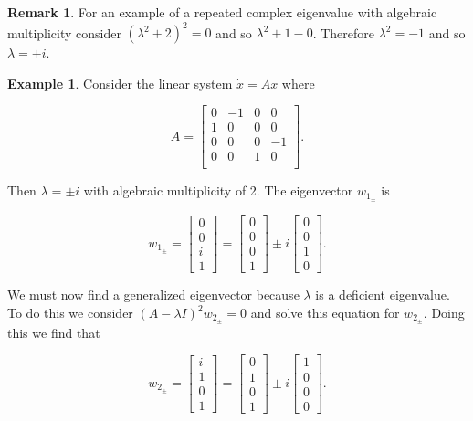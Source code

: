 \documentclass[12pt]{article}
\theoremstyle{definition}
\newtheorem*{example}{Example}
\newtheorem*{remark}{Remark}
\begin{document}
\begin{remark}
For an example of a repeated complex eigenvalue with algebraic multiplicity consider $(\lambda^2 + 2)^2 = 0$ and
so $\lambda^2 + 1 - 0$. Therefore $\lambda^2 = -1$ and so $\lambda = \pm i$.  
\end{remark}


\begin{example}

Consider the linear system $\dot x = Ax$ where

\[
A =
\begin{bmatrix}
0 & -1 & 0 & 0 \\
1 & 0 & 0 & 0 \\
0 & 0 & 0 & -1 \\
0 & 0 & 1 & 0 \\
\end{bmatrix}.
\]

Then $\lambda = \pm i$ with algebraic multiplicity of 2. The eigenvector $w_{1_{\pm}}$ is

\[
w_{1_{\pm}} = 
\begin{bmatrix}
0 \\
0 \\
i \\
1
\end{bmatrix}
=
\begin{bmatrix}
0 \\
0 \\
0 \\
1
\end{bmatrix}
\pm i
\begin{bmatrix}
0 \\
0 \\
1 \\
0
\end{bmatrix}.
\]

We must now find a generalized eigenvector because $\lambda$ is a deficient eigenvalue. To
do this we consider $(A - \lambda I)^2 w_{2_{\pm}} = 0$ and solve this equation for $w_{2_{\pm}}$.
Doing this we find that

\[
w_{2_{\pm}} =
\begin{bmatrix}
i \\
1 \\
0 \\
1
\end{bmatrix}
=
\begin{bmatrix}
0 \\
1 \\
0 \\
1
\end{bmatrix}
\pm i
\begin{bmatrix}
1 \\
0 \\
0 \\
0
\end{bmatrix}.
\]


\end{example}
\end{document}
